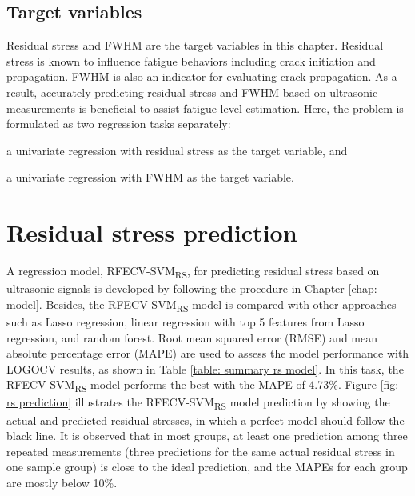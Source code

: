 \subsection{Target variables}
Residual stress and FWHM are the target variables in this chapter. Residual stress is known to influence fatigue behaviors including crack initiation and propagation. FWHM is also an indicator for evaluating crack propagation. As a result, accurately predicting residual stress and FWHM based on ultrasonic measurements is beneficial to assist fatigue level estimation. Here, the problem is formulated as two regression tasks separately:
\begin{enumerate*}[label=(\alph*)]
    \item a univariate regression with residual stress as the target variable, and
    \item a univariate regression with FWHM as the target variable.
\end{enumerate*}


\section{Residual stress prediction}
\label{sec: rs prediction}
A regression model, RFECV-SVM\textsubscript{RS}, for predicting residual stress based on ultrasonic signals is developed by following the procedure in Chapter \ref{chap: model}. Besides, the RFECV-SVM\textsubscript{RS} model is compared with other approaches such as Lasso regression, linear regression with top 5 features from Lasso regression, and random forest. Root mean squared error (RMSE) and mean absolute percentage error (MAPE) are used to assess the model performance with LOGOCV results, as shown in Table \ref{table: summary rs model}. In this task, the RFECV-SVM\textsubscript{RS} model performs the best with the MAPE of 4.73\%. Figure \ref{fig: rs prediction} illustrates the RFECV-SVM\textsubscript{RS} model prediction by showing the actual and predicted residual stresses, in which a perfect model should follow the black line. It is observed that in most groups, at least one prediction among three repeated measurements (three predictions for the same actual residual stress in one sample group) is close to the ideal prediction, and the MAPEs for each group are mostly below 10\%.

